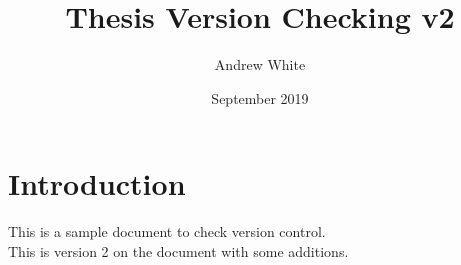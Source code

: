 \documentclass{article}
\title{Thesis Version Checking v2}
\author{Andrew White}
\date{September 2019}
\begin{document}
\maketitle

\section{Introduction}

This is a sample document to check version control.\\

This is version 2 on the document with some additions.

\blindtext[3]
\end{document}
